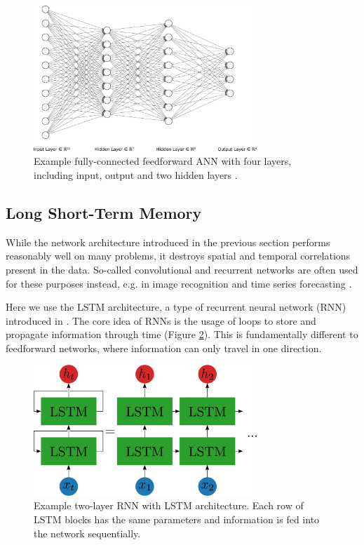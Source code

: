 \begin{figure}[h]
	\centering
	\includegraphics[width=0.75\textwidth]{img/nn}
	\caption{Example fully-connected feedforward ANN with four layers, including input, output and two hidden layers \cite{LeNail2019}.}
	\label{nn}
\end{figure}

\subsection{Long Short-Term Memory}
While the network architecture introduced in the previous section performs reasonably well on many problems, it destroys spatial and temporal correlations present in the data. 
So-called convolutional and recurrent networks are often used for these purposes instead, e.g. in image recognition and time series forecasting \cite{rumelhart1986learning, 10.1007/978-3-642-46466-9_18}.

Here we use the LSTM architecture, a type of recurrent neural network (RNN) introduced in \cite{doi:10.1162/neco.1997.9.8.1735}. 
The core idea of RNNs is the usage of loops to store and propagate information through time (Figure \ref{rnn}).
This is fundamentally different to feedforward networks, where information can only travel in one direction.

\begin{figure}[ht]
	\centering
	\includegraphics[width=0.75\textwidth]{img/rnn}
	\caption{Example two-layer RNN with LSTM architecture. Each row of LSTM blocks has the same parameters and information is fed into the network sequentially.}
	\label{rnn}
\end{figure}

